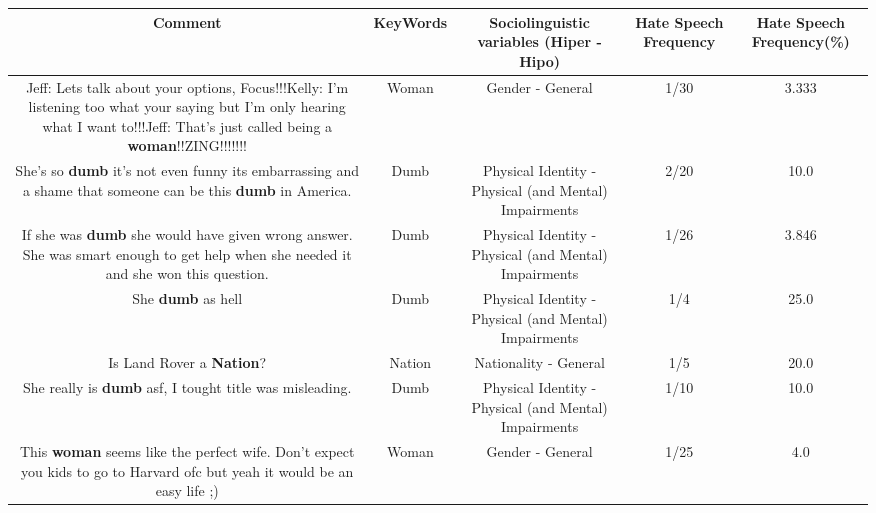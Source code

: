 \documentclass[11pt]{article}
\newlength\mylength
\begin{document}
\begin{center}
\setlength\mylength{\dimexpr\textwidth - 1\arrayrulewidth - 50\tabcolsep}
\begin{longtable}{|C{.65\mylength}|C{.30\mylength}|C{.12\mylength}|C{.12\mylength}|C{.12\mylength}|}
\hline
\textbf{Comment} & \textbf{KeyWords} & \textbf{Sociolinguistic variables (Hiper - Hipo)}  & \textbf{Hate Speech Frequency} & \textbf{Hate Speech Frequency(\%)} \\
\hline{}\small Jeff: Lets talk about your options, Focus!!!Kelly: I'm listening too what your saying but I'm only hearing what I want to!!!Jeff:  That's just called being a \textbf{woman}!!ZING!!!!!!!\normalsize   & Woman & Gender - General & 1/30 & 3.333 \\  \hline
  \small She's so \textbf{dumb} it's not even funny its embarrassing and a shame that someone can be this \textbf{dumb} in America.\normalsize   & Dumb & Physical Identity - Physical (and Mental) Impairments & 2/20 & 10.0 \\  \hline
  \small If she was \textbf{dumb} she would have given wrong answer. She was smart enough to get help when she needed it and she won this question.\normalsize   & Dumb & Physical Identity - Physical (and Mental) Impairments & 1/26 & 3.846 \\  \hline
  \small She \textbf{dumb} as hell\normalsize   & Dumb & Physical Identity - Physical (and Mental) Impairments & 1/4 & 25.0 \\  \hline
  \small Is Land Rover a \textbf{Nation}?\normalsize   & Nation & Nationality - General & 1/5 & 20.0 \\  \hline
  \small She really is \textbf{dumb} asf, I tought title was misleading.\normalsize   & Dumb & Physical Identity - Physical (and Mental) Impairments & 1/10 & 10.0 \\  \hline
  \small This \textbf{woman} seems like the perfect wife. Don't expect you kids to go to Harvard ofc but yeah it would be an easy life ;)\normalsize   & Woman & Gender - General & 1/25 & 4.0 \\  \hline

\end{longtable}
\end{center}
\end{document}
